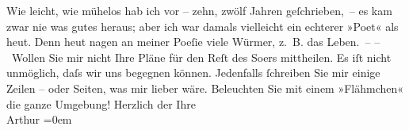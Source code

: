 \begin{ledgroupsized}[t]{13cm}
               Wie leicht, wie mühelos hab ich vor – zehn, zwölf Jahren geſchrieben, – {\pb}es kam zwar nie was gutes heraus; aber ich war damals
               vielleicht ein echterer »Poet« als heut. Denn heut nagen an meiner Poeſie viele
               Würmer, z. B. das Leben. –\pend
           \pstart
           – Wollen Sie mir nicht Ihre Pläne für den Reſt des So{\geminationm}ers mittheilen. Es iſt nicht unmöglich, daſs wir uns begegnen können. Jedenfalls
               ſchreiben Sie mir einige Zeilen – oder Seiten, was mir lieber wäre. Beleuchten {\pb}Sie mit einem »Flähmchen« die ganze Umgebung!\pend
           \pstart
           Herzlich der Ihre{\\[\baselineskip]}\spacefill\mbox{Arthur}\pend
           \leftskip=0em{}
         
         \endnumbering{}\end{ledgroupsized}  \newcommand{\dateiname}{L00248}\newcommand{\titel}{Arthur Schnitzler an Hugo von Hofmannsthal, 2. 8. 1893}\newcommand{\editorInnen}{ Martin Anton Müller und Gerd-Hermann Susen}
      